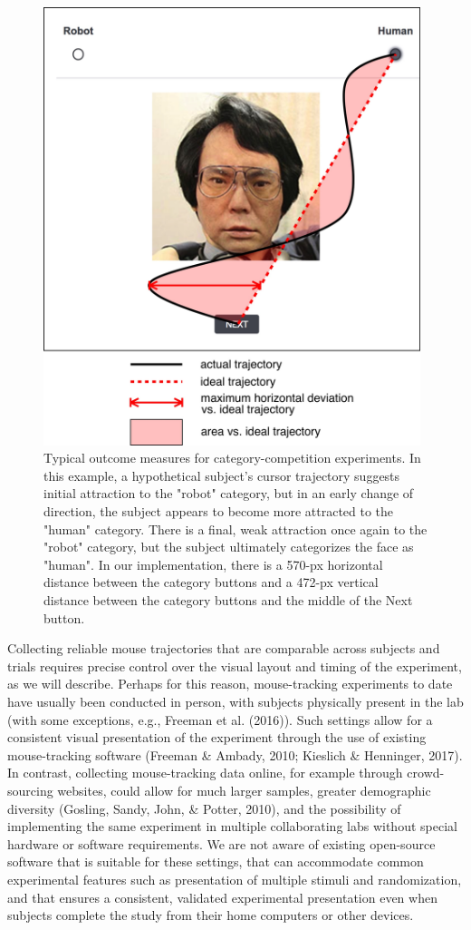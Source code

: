 \documentclass[]{article}
\begin{document}
\begin{figure}[h]
\centering
\includegraphics[width=110mm]{Figures/Figure 1.jpeg}
\caption{\label{fig:diagram}Typical outcome measures for category-competition experiments. In this example, a hypothetical subject's cursor trajectory suggests initial attraction to the "robot" category, but in an early change of direction, the subject appears to become more attracted to the "human" category. There is a final, weak attraction once again to the "robot" category, but the subject ultimately categorizes the face as "human". In our implementation, there is a 570-px horizontal distance between the category buttons and a 472-px vertical distance between the category buttons and the middle of the Next button.}
\end{figure}

Collecting reliable mouse trajectories that are comparable across
subjects and trials requires precise control over the visual layout and
timing of the experiment, as we will describe. Perhaps for this reason,
mouse-tracking experiments to date have usually been conducted in
person, with subjects physically present in the lab (with some
exceptions, e.g., Freeman et al. (2016)). Such settings allow for a
consistent visual presentation of the experiment through the use of
existing mouse-tracking software (Freeman \& Ambady, 2010; Kieslich \&
Henninger, 2017). In contrast, collecting mouse-tracking data online,
for example through crowd-sourcing websites, could allow for much larger
samples, greater demographic diversity (Gosling, Sandy, John, \& Potter,
2010), and the possibility of implementing the same experiment in
multiple collaborating labs without special hardware or software
requirements. We are not aware of existing open-source software that is
suitable for these settings, that can accommodate common experimental
features such as presentation of multiple stimuli and randomization, and
that ensures a consistent, validated experimental presentation even when
subjects complete the study from their home computers or other devices.
\end{document}
